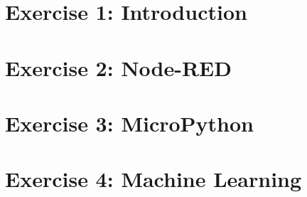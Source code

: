 




\renewcommand{\familydefault}{cmss}






\tableofcontents
\newpage
\listoffigures
\listoftables
\newpage

\printacronyms[heading=chapter*]
\newpage


\chapter{Exercise 1: Introduction}


\chapter{Exercise 2: Node-RED}


\chapter{Exercise 3: MicroPython}


\chapter{Exercise 4: Machine Learning}


{} 

\renewcommand{\bibname}{References}

\printbibliography


